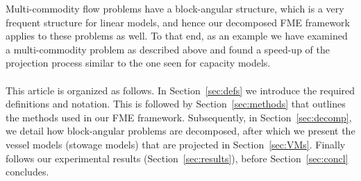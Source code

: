 Multi-commodity flow problems have a block-angular structure, which is a very frequent structure for linear models, and hence our decomposed FME framework applies to these problems as well. To that end, as an example we have examined a multi-commodity problem as described above and found a speed-up of the projection process similar to the one seen for capacity models. 
\\
\\
This article is organized as follows. In Section~\ref{sec:defs} we introduce the required definitions and notation. This is followed by Section~\ref{sec:methods} that outlines the methods used in our FME framework. Subsequently, in Section~\ref{sec:decomp}, we detail how block-angular problems are decomposed, after which we present the vessel models (stowage models) that are projected in Section~\ref{sec:VMs}. Finally follows our experimental results (Section~\ref{sec:results}), before Section~\ref{sec:concl} concludes.

%

%
